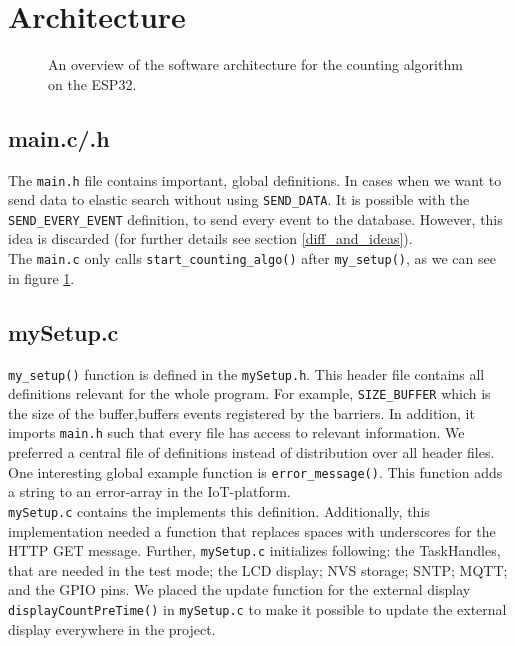 \section{Architecture}


\begin{figure}%
    \centering
    \resizebox{0.8\textwidth}{!}{
        
    }
    \caption[Software overview]{An overview of the software architecture for the counting algorithm on the ESP32.}
    \label{fig_architectureOverview}
\end{figure}

\subsection{main.c/.h}
The \verb!main.h! file contains important, global definitions.
In cases when we want to send data to elastic search without using \verb!SEND_DATA!. It is possible with
the \verb!SEND_EVERY_EVENT! definition, to send every event to the database. However, this idea is
discarded (for further details see section \ref{diff_and_ideas}).\\
The \verb!main.c! only calls \verb!start_counting_algo()! after \verb!my_setup()!, as we can see in
figure \ref{fig_architectureOverview}.

\subsection{mySetup.c}
\verb!my_setup()! function is defined in the \verb!mySetup.h!. This header file contains all definitions relevant for the
whole program. For example, \verb!SIZE_BUFFER! which is the size of the buffer,buffers
events registered by the barriers. In addition, it imports \verb!main.h! such that every file has access to relevant
information. We preferred a central file of definitions instead of distribution over all header files.\\
One interesting global example function is \verb!error_message()!.
This function adds a string to an error-array in the IoT-platform.\\
\verb!mySetup.c! contains the implements this definition. Additionally,
this implementation needed a function that replaces spaces with underscores for the HTTP GET message.
Further, \verb!mySetup.c!  initializes following:
the TaskHandles, that are needed in the test mode; the LCD display; NVS storage; SNTP; MQTT; and the GPIO pins.
We placed the update function for the external display
\verb!displayCountPreTime()! in \verb!mySetup.c!
to make it possible to update the external display everywhere in the project.

